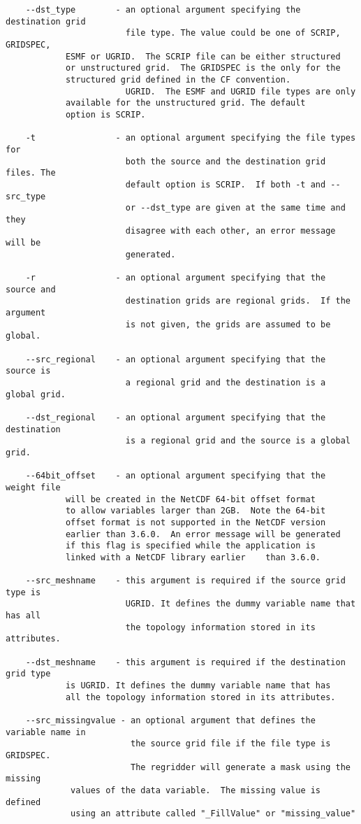 \begin{verbatim}
    --dst_type        - an optional argument specifying the destination grid 
                        file type. The value could be one of SCRIP, GRIDSPEC,
			ESMF or UGRID.  The SCRIP file can be either structured
 			or unstructured grid.  The GRIDSPEC is the only for the
			structured grid defined in the CF convention. 
                        UGRID.  The ESMF and UGRID file types are only 
			available for the unstructured grid. The default 
			option is SCRIP.

    -t                - an optional argument specifying the file types for 
                        both the source and the destination grid files. The 
                        default option is SCRIP.  If both -t and --src_type 
                        or --dst_type are given at the same time and they 
                        disagree with each other, an error message will be 
                        generated.

    -r                - an optional argument specifying that the source and 
                        destination grids are regional grids.  If the argument
                        is not given, the grids are assumed to be global.

    --src_regional    - an optional argument specifying that the source is 
                        a regional grid and the destination is a global grid.  

    --dst_regional    - an optional argument specifying that the destination 
                        is a regional grid and the source is a global grid.  

    --64bit_offset    - an optional argument specifying that the weight file 
			will be created in the NetCDF 64-bit offset format 
			to allow variables larger than 2GB.  Note the 64-bit 
			offset format is not supported in the NetCDF version 
			earlier than 3.6.0.  An error message will be generated 
			if this flag is specified while the application is 
			linked with a NetCDF library earlier	than 3.6.0.

    --src_meshname    - this argument is required if the source grid type is
                        UGRID. It defines the dummy variable name that has all 
                        the topology information stored in its attributes.

    --dst_meshname    - this argument is required if the destination grid type 
			is UGRID. It defines the dummy variable name that has 
			all the topology information stored in its attributes.

    --src_missingvalue - an optional argument that defines the variable name in
                         the source grid file if the file type is GRIDSPEC. 
                         The regridder will generate a mask using the missing 
			 values of the data variable.  The missing value is defined
			 using an attribute called "_FillValue" or "missing_value"


\end{verbatim}
